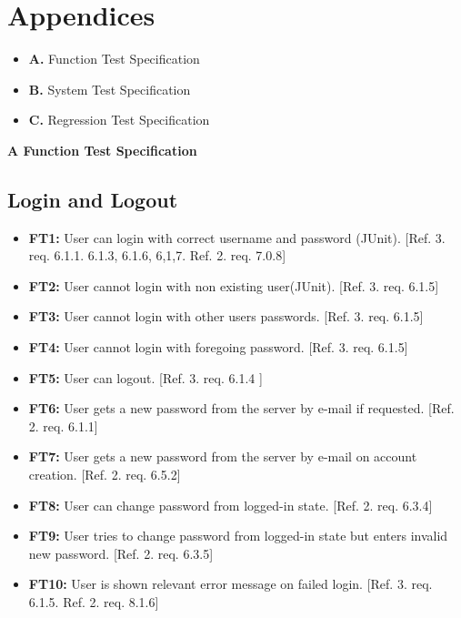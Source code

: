 \documentclass{article}
\begin{document}
\section{Appendices}
	\begin{itemize}
		\item \textbf{A.} Function Test Specification 
		\item \textbf{B.} System Test Specification 	
		\item \textbf{C.} Regression Test Specification 
		\end{itemize}
	
	\newpage
		\begin{flushleft}
		{\large \textbf{A Function Test Specification}}
		\end{flushleft}
		
		\subsection{Login and Logout}
		
		\begin{itemize}
  			\item \textbf{FT1:} User can login with correct username and password (JUnit). [Ref. 3. req. 6.1.1. 6.1.3, 6.1.6, 6,1,7. Ref. 2. req. 7.0.8]	
			
			\item \textbf{FT2:} User cannot login with non existing user(JUnit). [Ref. 3. req. 6.1.5]
			
			\item \textbf{FT3:} User cannot login with other users passwords. [Ref. 3. req. 6.1.5]
			
			\item \textbf{FT4:} User cannot login with foregoing password. [Ref. 3. req. 6.1.5]
				
			\item \textbf{FT5:} User can logout. [Ref. 3. req. 6.1.4 ]
			
  			\item \textbf{FT6:} User gets a new password from the server by e-mail if requested. [Ref. 2. req. 6.1.1]
  			
  			\item \textbf{FT7:} User gets a new password from the server by e-mail on account creation. [Ref. 2. req. 6.5.2]
  					
  			\item \textbf{FT8:} User can change password from logged-in state. [Ref. 2. req. 6.3.4] 
  						
  			\item \textbf{FT9:} User tries to change password from logged-in state but enters invalid new password. [Ref. 2. req. 6.3.5] 

  			\item \textbf{FT10:} User is shown relevant error message on failed login. [Ref. 3. req. 6.1.5. Ref. 2. req. 8.1.6] 
		\end{itemize}
		
\end{document}

